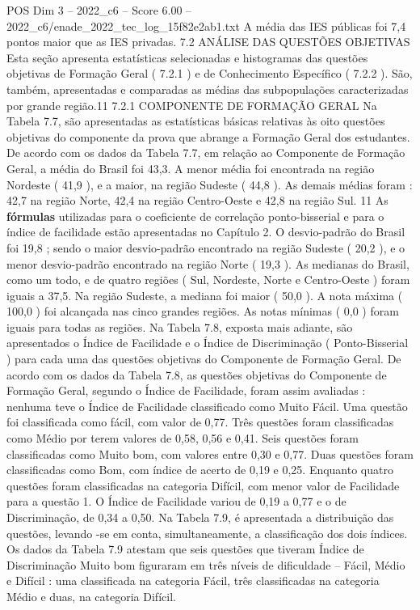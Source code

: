 \begin{textsample}{POS Dim 3 – 2022\_c6 – Score 6.00 – 2022\_c6/enade\_2022\_tec\_log\_15f82e2ab1.txt}
A média das IES públicas foi 7,4 pontos maior que as IES privadas. 7.2 ANÁLISE DAS QUESTÕES OBJETIVAS Esta seção apresenta estatísticas selecionadas e histogramas das questões objetivas de Formação Geral ( 7.2.1 ) e de Conhecimento Específico ( 7.2.2 ).
São, também, apresentadas e comparadas as médias das subpopulações caracterizadas por grande região.11 7.2.1 COMPONENTE DE FORMAÇÃO GERAL Na Tabela 7.7, são apresentadas as estatísticas básicas relativas às oito questões objetivas do componente da prova que abrange a Formação Geral dos estudantes.
De acordo com os dados da Tabela 7.7, em relação ao Componente de Formação Geral, a média do Brasil foi 43,3.
A menor média foi encontrada na região Nordeste ( 41,9 ), e a maior, na região Sudeste ( 44,8 ).
As demais médias foram : 42,7 na região Norte, 42,4 na região Centro-Oeste e 42,8 na região Sul. 11 As \textbf{fórmulas} utilizadas para o coeficiente de correlação ponto-bisserial e para o índice de facilidade estão apresentadas no Capítulo 2.
O desvio-padrão do Brasil foi 19,8 ; sendo o maior desvio-padrão encontrado na região Sudeste ( 20,2 ), e o menor desvio-padrão encontrado na região Norte ( 19,3 ).
As medianas do Brasil, como um todo, e de quatro regiões ( Sul, Nordeste, Norte e Centro-Oeste ) foram iguais a 37,5.
Na região Sudeste, a mediana foi maior ( 50,0 ).
A nota máxima ( 100,0 ) foi alcançada nas cinco grandes regiões.
As notas mínimas ( 0,0 ) foram iguais para todas as regiões.
Na Tabela 7.8, exposta mais adiante, são apresentados o Índice de Facilidade e o Índice de Discriminação ( Ponto-Bisserial ) para cada uma das questões objetivas do Componente de Formação Geral.
De acordo com os dados da Tabela 7.8, as questões objetivas do Componente de Formação Geral, segundo o Índice de Facilidade, foram assim avaliadas : nenhuma teve o Índice de Facilidade classificado como Muito Fácil.
Uma questão foi classificada como fácil, com valor de 0,77.
Três questões foram classificadas como Médio por terem valores de 0,58, 0,56 e 0,41.
Seis questões foram classificadas como Muito bom, com valores entre 0,30 e 0,77.
Duas questões foram classificadas como Bom, com índice de acerto de 0,19 e 0,25.
Enquanto quatro questões foram classificadas na categoria Difícil, com menor valor de Facilidade para a questão 1.
O Índice de Facilidade variou de 0,19 a 0,77 e o de Discriminação, de 0,34 a 0,50.
Na Tabela 7.9, é apresentada a distribuição das questões, levando -se em conta, simultaneamente, a classificação dos dois índices.
Os dados da Tabela 7.9 atestam que seis questões que tiveram Índice de Discriminação Muito bom figuraram em três níveis de dificuldade – Fácil, Médio e Difícil : uma classificada na categoria Fácil, três classificadas na categoria Médio e duas, na categoria Difícil.

\end{textsample}
